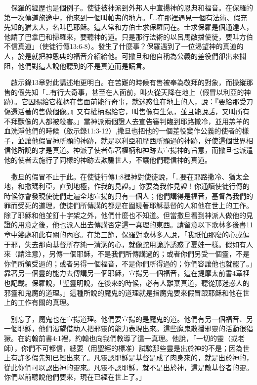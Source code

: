 \documentclass{book}
\begin{document}
　保羅的經歷也是個例子。使徒被神派到外邦人中宣揚神的恩典和福音。在保羅的第一次傳道旅途中，他來到一個叫帕弗的地方。「…在那裡遇見一個有法術、假充先知的猶太人，名叫巴耶穌。這人常和方伯士求保羅同在。士求保羅是個通達人，他請了巴拿巴和掃羅來，要聽神的道。只是那行法術的以呂馬敵擋使徒，要叫方伯不信真道」（使徒行傳13:6-8）。發生了什麼事？保羅遇到了一位渴望神的真道的人，於是就把神恩典的福音介紹給他。可撒旦和他自稱為公義的差役們卻出來攔阻，他們對這人說他聽到的不是真道而是謊言。

　啟示錄13章對此講述地更明白。在苦難的時候有售被奉為敬拜的對象，而操縱那售的假先知「…有行大奇事，甚至在人面前，叫火從天降在地上（假冒以利亞的神跡）。它因賜給它權柄在售面前能行奇事，就迷惑住在地上的人，說：『要給那受刀傷還活著的售做個像。』又有權柄賜給它，叫售像有生氣，並且能說話，又叫所有不拜獸像的人都被殺害。」當神派兩個證人去宣告審判臨到耶路撒冷，並用羔羊的血洗淨他們的時候（啟示錄11:3-12）,撒旦也把他的一個差役變作公義的使者的樣子，並讓他假冒神所顯的神跡，就是以利亞和摩西所顯過的神跡，好使這個世界相信他所說的才是真道。神派了使者帶著權柄和神跡去宣揚神的旨意，而撒旦也派遣他的使者去施行了同樣的神跡去欺騙世人，不讓他們聽信神的真道。

　撒旦的假冒不止于此。在使徒行傳1:8裡神對使徒說，「…要在耶路撒冷、猶太全地，和撒瑪利亞，直到地極，作我的見證。」你要為我作見證！你通讀使徒行傳的時候你會發現使徒們走遍全地宣揚的只有一個人；他們講得是福音，基督為我們的罪而受死的道理，使徒們所傳講的都是在圍繞著耶穌基督的人和他在世上的工作。除了耶穌和他並釘十字架之外，他們什麼也不知道。但當撒旦看到神派人做他的見證的用意之後，他也派人出去傳講否定這一真理的東西。請留意以下歌林多後書11章中幾處和此有關的內容。在第三節，保羅對歌林多人說，「我祇怕那麼的心或偏于邪，失去那向基督所存純一清潔的心，就像蛇用詭詐誘惑了夏娃一樣。假如有人來（請注意），另傳一個耶穌，不是我們所傳講過的；或者你們另受一個靈，不是你們所領受過的；或者另得一個福音，不是你們所得過的；你們容讓他也就罷了。」靠著另一個靈的能力去傳講另一個耶穌，宣揚另一個福音，這在提摩太前書4章裡也記載。保羅說，「聖靈明說，在後來的時候，必有人離棄真道，聽從那迷惑人的邪靈和鬼魔的道理。」這種所說的魔鬼的道理就是指魔鬼要來假冒跟耶穌和他在世上的工作有關的真理。

　別忘了，魔鬼也在宣揚道理。他們要宣揚的是魔鬼的道。他們有另一個福音、另一個耶穌，他們渴望借助人把邪靈的能力表現出來。這些魔鬼散播邪靈的活動很猖獗。在約翰前書4:1裡，約翰也向我們教導了這一真理。他說，「一切的靈（或老師），你們不可都信，總要（用聖經的標准）試驗那些靈是出於神的不是；因為世上有許多假先知已經出來了。凡靈認耶穌是基督是成了肉身來的，就是出於神的，從此你們可以認出神的靈來。凡靈不認耶穌，就不是出於神，這是敵基督者的靈。你們以前聽說他們要來，現在已經在世上了。」
\end{document}
